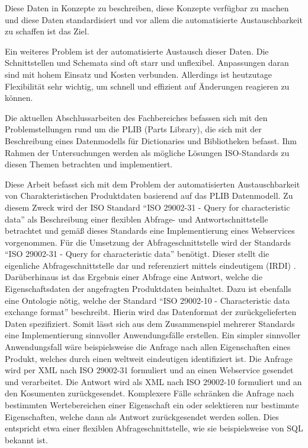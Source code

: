 Diese Daten in Konzepte zu beschreiben, diese Konzepte verfügbar zu machen und diese Daten standardisiert und vor allem die automatisierte Austauschbarkeit zu schaffen ist das Ziel. 

Ein weiteres Problem ist der automatisierte Austausch dieser Daten. Die Schnittstellen und Schemata sind oft starr und unflexibel. Anpassungen daran sind mit hohem Einsatz und Kosten verbunden. Allerdings ist heutzutage Flexibilität sehr wichtig, um schnell und effizient auf Änderungen reagieren zu können. 

Die aktuellen Abschlussarbeiten des Fachbereiches befassen sich mit den Problemstellungen rund um die \gls{PLIB} (Parts Library), die sich mit der Beschreibung eines Datenmodells für Dictionaries und Bibliotheken befasst. Ihm Rahmen der Untersuchungen werden als mögliche Lösungen ISO-Standards zu diesen Themen betrachten und implementiert. 

Diese Arbeit befasst sich mit dem Problem der automatisierten Austauschbarkeit von Charakteristischen Produktdaten basierend auf das PLIB Datenmodell. Zu diesem Zweck wird der ISO Standard \enquote{ISO 29002-31 - Query for characteristic data} als Beschreibung einer flexiblen Abfrage- und Antwortschnittstelle betrachtet und gemäß dieses Standards eine Implementierung eines \glspl{Webservice} vorgenommen. 
Für die Umsetzung der Abfrageschnittstelle wird der Standards \enquote{ISO 29002-31 - Query for characteristic data} benötigt. Dieser stellt die eigenliche Abfrageschnittstelle dar und referenziert mittels eindeutigem  (IRDI) . Darüberhinaus ist das Ergebnis einer Abfrage eine Antwort, welche die Eigenschaftsdaten der angefragten Produktdaten beinhaltet. Dazu ist ebenfalls eine Ontologie nötig, welche der Standard \enquote{ISO 29002-10 - Characteristic data exchange format} beschreibt. Hierin wird das Datenformat der zurückgelieferten Daten spezifiziert. Somit lässt sich aus dem Zusammenspiel mehrerer Standards eine Implementierung sinnvoller Anwendungsfälle erstellen. 
Ein simpler sinnvoller Anwendungsfall wäre beispielsweise die Anfrage nach allen Eigenschaften eines Produkt, welches durch einen weltweit eindeutigen  identifiziert ist. Die Anfrage wird per XML nach ISO 29002-31 formuliert und an einen \gls{Webservice} gesendet und verarbeitet. Die Antwort wird als XML nach ISO 29002-10 formuliert und an den Kosumenten zurückgesendet. Komplexere Fälle schränken die Anfrage nach bestimmten Wertebereichen einer Eigenschaft ein oder selektieren nur bestimmte Eigenschaften, welche dann als Antwort zurückgesendet werden sollen. Dies entspricht etwa einer flexiblen Abfrageschnittstelle, wie sie beispielsweise von SQL bekannt ist.  


